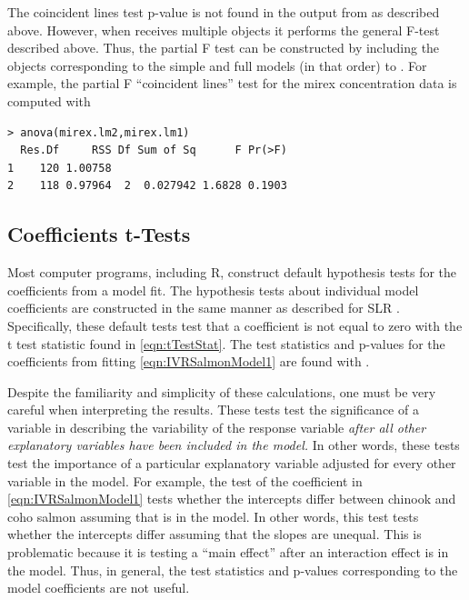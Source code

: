 \documentclass[10pt,openany]{book}\usepackage[]{graphicx}\usepackage[]{color}
\makeatletter
\newenvironment{kframe}{%
 \def\at@end@of@kframe{}%
 \ifinner\ifhmode%
  \def\at@end@of@kframe{\end{minipage}}%
  \begin{minipage}{\columnwidth}%
 \fi\fi%
 \def\FrameCommand##1{\hskip\@totalleftmargin \hskip-\fboxsep
 \colorbox{shadecolor}{##1}\hskip-\fboxsep
     \hskip-\linewidth \hskip-\@totalleftmargin \hskip\columnwidth}%
 \MakeFramed {\advance\hsize-\width
   \@totalleftmargin\z@ \linewidth\hsize
   \@setminipage}}%
 {\par\unskip\endMakeFramed%
 \at@end@of@kframe}
\newenvironment{knitrout}{}{} %
\makeatother
\begin{document}
The coincident lines test p-value is not found in the output from  as described above.  However, when  receives multiple  objects it performs the general F-test described above.  Thus, the partial F test can be constructed by including the  objects corresponding to the simple and full models (in that order) to .  For example, the partial F ``coincident lines'' test for the mirex concentration data is computed with

\begin{knitrout}
\color{fgcolor}\begin{kframe}
\begin{verbatim}
> anova(mirex.lm2,mirex.lm1)
  Res.Df     RSS Df Sum of Sq      F Pr(>F)
1    120 1.00758                           
2    118 0.97964  2  0.027942 1.6828 0.1903
\end{verbatim}
\end{kframe}
\end{knitrout}


\subsection{Coefficients t-Tests}
Most computer programs, including R, construct default hypothesis tests for the coefficients from a model fit.  The hypothesis tests about individual model coefficients are constructed in the same manner as described for SLR .  Specifically, these default tests test that a coefficient is not equal to zero with the t test statistic found in \eqref{eqn:tTestStat}.  The test statistics and p-values for the coefficients from fitting \eqref{eqn:IVRSalmonModel1} are found with .


Despite the familiarity and simplicity of these calculations, one must be very careful when interpreting the results.  These tests test the significance of a variable in describing the variability of the response variable \emph{after all other explanatory variables have been included in the model.}  In other words, these tests test the importance of a particular explanatory variable adjusted for every other variable in the model.  For example, the test of the  coefficient in \eqref{eqn:IVRSalmonModel1} tests whether the intercepts differ between chinook and coho salmon assuming that  is in the model.  In other words, this test tests whether the intercepts differ assuming that the slopes are unequal.  This is problematic because it is testing a ``main effect'' after an interaction effect is in the model.  Thus, in general, the test statistics and p-values corresponding to the model coefficients are not useful.
\end{document}
